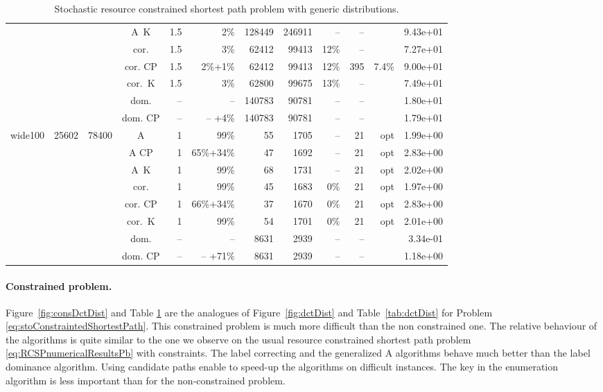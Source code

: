 \documentclass[11pt]{amsart}
\newenvironment{outdent}
{\begin{list}{}{\leftmargin-2cm\rightmargin\leftmargin}\centering\item\relax}
{\end{list}\ignorespacesafterend}
\theoremstyle{plain}
\theoremstyle{remark}
\begin{document}
\begin{table}
\begin{outdent}
\begin{small}
\begin{tabular}{|l|rrc|rr|rrr|rr|r|}
&&&A~K & 1.5 & 2\% &128449 & 246911 & -- & -- & & 9.43e+01 \\
&&&cor. & 1.5 & 3\% &62412 & 99413 & 12\% & -- & & 7.27e+01 \\
&&&cor. CP & 1.5 & 2\%+1\% &62412 & 99413 & 12\% &395 & 7.4\% & 9.00e+01 \\
&&&cor.~K & 1.5 & 3\% &62800 & 99675 & 13\% & -- & & 7.49e+01 \\
&&&dom. & -- & --  &140783 & 90781 & -- & -- & & 1.80e+01 \\
&&&dom. CP & -- & -- +4\% &140783 & 90781 & -- & -- & & 1.79e+01 \\
\hline
wide100 & 25602 & 78400 & A & 1 & 99\% &55 & 1705 & -- &21 & opt & 1.99e+00 \\
&&&A CP & 1 & 65\%+34\% &47 & 1692 & -- &21 & opt & 2.83e+00 \\
&&&A~K & 1 & 99\% &68 & 1731 & -- &21 & opt & 2.02e+00 \\
&&&cor. & 1 & 99\% &45 & 1683 & 0\% &21 & opt & 1.97e+00 \\
&&&cor. CP & 1 & 66\%+34\% &37 & 1670 & 0\% &21 & opt & 2.83e+00 \\
&&&cor.~K & 1 & 99\% &54 & 1701 & 0\% &21 & opt & 2.01e+00 \\
&&&dom. & -- & --  &8631 & 2939 & -- & -- & & 3.34e-01 \\
&&&dom. CP & -- & -- +71\% &8631 & 2939 & -- & -- & & 1.18e+00 \\
\hline
\end{tabular}
\end{small}
\end{outdent}
\caption{Stochastic resource constrained shortest path problem with generic distributions.}
\label{tab:consDctDist}
\end{table}

\paragraph{Constrained problem.}
Figure~\ref{fig:consDctDist} and Table \ref{tab:consDctDist} are the analogues of Figure~\ref{fig:dctDist} and Table~\ref{tab:dctDist} for Problem \eqref{eq:stoConstraintedShortestPath}. This constrained problem is much more difficult than the non constrained one. The relative behaviour of the algorithms is quite similar to the one we observe on the usual resource constrained shortest path problem \eqref{eq:RCSPnumericalResultsPb} with  constraints. The label correcting and the generalized A algorithms behave much better than the label dominance algorithm. Using candidate paths enable to speed-up the algorithms on difficult instances. The key in the enumeration algorithm is less important than for the non-constrained problem.
\end{document}
